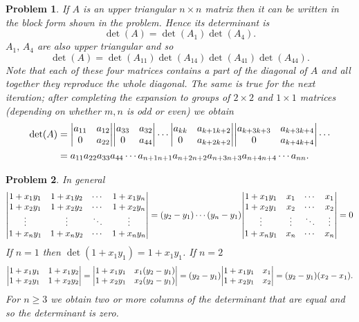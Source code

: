 \documentclass{article}
\theoremstyle{pprop}
\newtheorem{problem}{Problem}[section]
\begin{document}
\begin{problem}
If $A$ is an upper triangular $n \times n$ matrix then it can be written in the block form shown in the problem.
Hence its determinant is 
\[
\det(A)=\det(A_1)\det(A_4).
\]
$A_1, \, A_4$ are also upper triangular and so 
\[
\det(A)=\det(A_{11})\det(A_{14})\det(A_{41})\det(A_{44}).
\]
Note that each of these four matrices contains a part of the diagonal of $A$ and all together 
they reproduce the whole diagonal. The same is true for the next iteration; after completing the expansion
to groups of $2 \times 2$ and $1 \times 1$ matrices (depending on whether $m,n$ is odd or even) we obtain 
\begin{align*}
\det(A) & =\mqty|a_{11} & a_{12} \\ 0 & a_{22}|\mqty|a_{33} & a_{32} \\ 0 & a_{44}|
\cdots \mqty|a_{kk} & a_{k+1k+2} \\ 0 & a_{k+2k+2}|\mqty|a_{k+3k+3} & a_{k+3k+4} \\ 0 & a_{k+4k+4}|
\cdots \\
& = a_{11}a_{22}a_{33}a_{44}\cdots a_{n+1n+1}a_{n+2n+2}a_{n+3n+3}a_{n+4n+4}\cdots a_{nn}.
\end{align*}  
\end{problem}
\begin{problem}
In general 
\[
\mqty|
1+ x_1 y_1 & 1+ x_1 y_2 & \cdots & 1+ x_1 y_n \\
1+ x_2 y_1 & 1+ x_2 y_2 & \cdots & 1+ x_2 y_n \\
\vdots & \vdots & \ddots & \vdots \\
1+ x_n y_1 & 1+ x_n y_2 & \cdots & 1+ x_n y_n \\
|
=
(y_2-y_1)\cdots(y_n-y_1)
\mqty|
1+ x_1 y_1 & x_1  & \cdots & x_1  \\
1+ x_2 y_1 & x_2 & \cdots & x_2  \\
\vdots & \vdots & \ddots & \vdots \\
1+ x_n y_1 & x_n  & \cdots & x_n  \\
|=0
\] 
If $n=1$ then $\det(1+x_1y_1)=1+x_1y_1$. If $n=2$
\[
\mqty|
1+ x_1 y_1 & 1+ x_1 y_2 \\
1+ x_2 y_1 & 1+ x_2 y_2 \\
|
=
\mqty|
1+ x_1 y_1 & x_1 (y_2-y_1) \\
1+ x_2 y_1 & x_2 (y_2-y_1) \\
|
=
(y_2-y_1)
\mqty|
1+ x_1 y_1 & x_1  \\
1+ x_2 y_1 & x_2  \\
|
=(y_2-y_1) (x_2-x_1).
\] 
For $n\geq 3$ we obtain two or more columns of the determinant that are equal and so the determinant is zero.
\end{problem}
\end{document}
